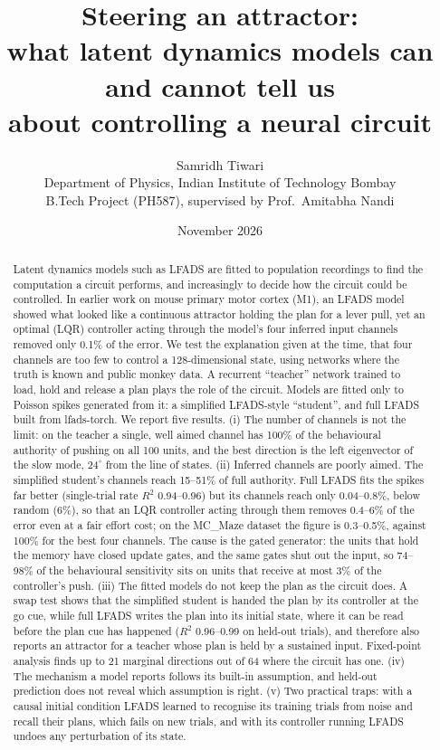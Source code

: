 \documentclass[11pt,a4paper]{article}
\title{\textbf{Steering an attractor:\\[2pt] what latent dynamics models can and cannot tell us\\ about controlling a neural circuit}}
\author{Samridh Tiwari\\[2pt]
\small Department of Physics, Indian Institute of Technology Bombay\\
\small B.Tech Project (PH587), supervised by Prof.\ Amitabha Nandi}
\date{November 2026}
\begin{document}
\maketitle
\thispagestyle{empty}

\begin{abstract}
\noindent
Latent dynamics models such as LFADS are fitted to population recordings to find the computation a circuit performs, and increasingly to decide how the circuit could be controlled. In earlier work on mouse primary motor cortex (M1), an LFADS model showed what looked like a continuous attractor holding the plan for a lever pull, yet an optimal (LQR) controller acting through the model's four inferred input channels removed only 0.1\% of the error. We test the explanation given at the time, that four channels are too few to control a 128-dimensional state, using networks where the truth is known and public monkey data. A recurrent ``teacher'' network trained to load, hold and release a plan plays the role of the circuit. Models are fitted only to Poisson spikes generated from it: a simplified LFADS-style ``student'', and full LFADS built from lfads-torch.
We report five results. (i) The number of channels is not the limit: on the teacher a single, well aimed channel has 100\% of the behavioural authority of pushing on all 100 units, and the best direction is the left eigenvector of the slow mode, $24^\circ$ from the line of states. (ii) Inferred channels are poorly aimed. The simplified student's channels reach 15--51\% of full authority. Full LFADS fits the spikes far better (single-trial rate $R^2$ 0.94--0.96) but its channels reach only 0.04--0.8\%, below random (6\%), so that an LQR controller acting through them removes 0.4--6\% of the error even at a fair effort cost; on the MC\_Maze dataset the figure is 0.3--0.5\%, against 100\% for the best four channels. The cause is the gated generator: the units that hold the memory have closed update gates, and the same gates shut out the input, so 74--98\% of the behavioural sensitivity sits on units that receive at most 3\% of the controller's push. (iii) The fitted models do not keep the plan as the circuit does. A swap test shows that the simplified student is handed the plan by its controller at the go cue, while full LFADS writes the plan into its initial state, where it can be read before the plan cue has happened ($R^2$ 0.96--0.99 on held-out trials), and therefore also reports an attractor for a teacher whose plan is held by a sustained input. Fixed-point analysis finds up to 21 marginal directions out of 64 where the circuit has one. (iv) The mechanism a model reports follows its built-in assumption, and held-out prediction does not reveal which assumption is right. (v) Two practical traps: with a causal initial condition LFADS learned to recognise its training trials from noise and recall their plans, which fails on new trials, and with its controller running LFADS undoes any perturbation of its state.

\end{abstract}
\end{document}
